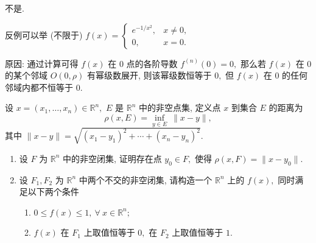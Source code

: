 \begin{solution}
不是.

反例可以举 (不限于) $f(x) = \begin{cases}
e^{-1/x^2}, & x \neq 0, \\ 0, & x = 0.
\end{cases}$

原因: {\color{red} 通过计算}可得 $f(x)$ 在 $0$ 点的各阶导数 $f^{(n)}(0) = 0,$ 那么若 $f(x)$ 在 $0$ 的某个邻域 $O(0, \rho)$ 有幂级数展开, 则该幂级数恒等于 $0,$ 但 $f(x)$ 在 $0$ 的任何邻域内都不恒等于 $0.$
\end{solution}


\begin{question}[points = 10]
设 $x = (x_1, \dots, x_n) \in \mathbb{R}^n,$ $E$ 是 $\mathbb{R}^n$ 中的非空点集, 定义点 $x$ 到集合 $E$ 的距离为
\[\rho(x, E) = \inf_{y \in E} ~ \lVert x - y \rVert,\]
其中 $\lVert x - y \rVert = \sqrt{(x_1 - y_1)^2 + \cdots + (x_n - y_n)^2}.$
\begin{enumerate}
\item 设 $F$ 为 $\mathbb{R}^n$ 中的非空闭集, 证明存在点 $y_0 \in F,$ 使得 $\rho(x, F) = \lVert x - y_0 \rVert.$
\item 设 $F_1, F_2$ 为 $\mathbb{R}^n$ 中两个不交的非空闭集, 请构造一个 $\mathbb{R}^n$ 上的 $f(x),$ 同时满足以下两个条件
\begin{enumerate}
\item $0 \leqslant f(x) \leqslant 1, ~ \forall ~ x \in \mathbb{R}^n;$
\item $f(x)$ 在 $F_1$ 上取值恒等于 $0,$ 在 $F_2$ 上取值恒等于 $1.$
\end{enumerate}
\end{enumerate}

\end{question}

